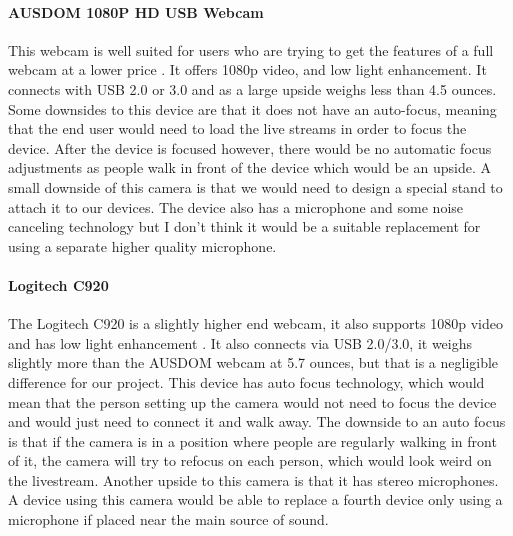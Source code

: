 \documentclass[onecolumn, draftclsnofoot,10pt, compsoc]{IEEEtran}
\begin{document}
            \paragraph{AUSDOM 1080P HD USB Webcam}
            This webcam is well suited for users who are trying to get the features of a full webcam at a lower price \cite{IEEEhowto:AUSDOM1080p}. It offers 1080p video, and low light enhancement. It connects with USB 2.0 or 3.0 and as a large upside weighs less than 4.5 ounces. Some downsides to this device are that it does not have an auto-focus, meaning that the end user would need to load the live streams in order to focus the device. After the device is focused however, there would be no automatic focus adjustments as people walk in front of the device which would be an upside. A small downside of this camera is that we would need to design a special stand to attach it to our devices. The device also has a microphone and some noise canceling technology but I don't think it would be a suitable replacement for using a separate higher quality microphone.
            \paragraph{Logitech C920}
            The Logitech C920 is a slightly higher end webcam, it also supports 1080p video and has low light enhancement \cite{IEEEhowto:LogitechC920}. It also connects via USB 2.0/3.0, it weighs slightly more than the AUSDOM webcam at 5.7 ounces, but that is a negligible difference for our project. This device has auto focus technology, which would mean that the person setting up the camera would not need to focus the device and would just need to connect it and walk away. The downside to an auto focus is that if the camera is in a position where people are regularly walking in front of it, the camera will try to refocus on each person, which would look weird on the livestream. Another upside to this camera is that it has stereo microphones. A device using this camera would be able to replace a fourth device only using a microphone if placed near the main source of sound.
\end{document}
